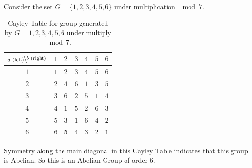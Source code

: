 \begin{example}
Consider the set $G=\{1,2,3,4,5,6\}$ under multiplication $\mod 7$.
\begin{table}[h!]
    \centering
    \begin{tabular}{c||c|c|c|c|c|c|}
         $\bsfrac{b\text{ (right)}}{a\text{ (left)}}$& $1$&$2$&$3$&$4$&$5$&$6$  \\ \hline \hline
         $1$&$1$&$2$&$3$&$4$&$5$&$6$  \\ \hline
         $2$&$2$&$4$&$6$&$1$&$3$& $5$\\ \hline
         $3$&$3$&$6$&$2$&$5$ &$1$ &$4$  \\ \hline
         $4$&$4$&$1$&$5$ &$2$ &$6$ &$3$ \\ \hline
         $5$&$5$&$3$ &$1$ &$6$ &$4$ &$2$   \\ \hline
         $6$&$6$&$5$ &$4$ &$3$ &$2$ &$1$   \\ \hline
    \end{tabular}
    \caption{Cayley Table for group generated by $G={1,2,3,4,5,6}$ under multiply $\mod 7$.}
    \label{tab:Cayley_G_7}
\end{table}

\noindent Symmetry along the main diagonal in this Cayley Table indicates that this group is
Abelian. So this is an Abelian Group of order 6. \steezybreak


\end{example}
